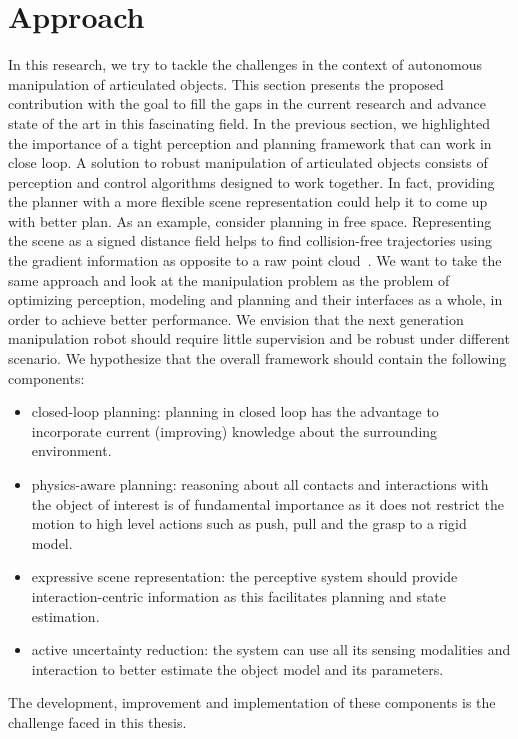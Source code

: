 \section{Approach}
\label{sec:Approach}

In this research, we try to tackle the challenges in the context of autonomous manipulation of articulated objects. This section presents the proposed contribution with the goal to fill the gaps in the current research and advance state of the art in this fascinating field. In the previous section, we highlighted the importance of a tight perception and planning framework that can work in close loop. A solution to robust manipulation of articulated objects consists of perception and control algorithms designed to work together. In fact, providing the planner with a more flexible scene representation could help it to come up with better plan. As an example, consider planning in free space. Representing the scene as a signed distance field helps to find collision-free trajectories using the gradient information as opposite to a raw point cloud~\cite{oleynikova2017voxblox}. We want to take the same approach and look at the manipulation problem as the problem of optimizing perception, modeling and planning and their interfaces as a whole, in order to achieve better performance. We envision that the next generation manipulation robot should require little supervision and be robust under different scenario. We hypothesize that the overall framework should contain the following components:
\begin{itemize}
\item closed-loop planning: planning in closed loop has the advantage to incorporate current (improving) knowledge about the surrounding environment.
\item physics-aware planning: reasoning about all contacts and interactions with the object of interest is of fundamental importance as it does not restrict the motion to high level actions such as push, pull and the grasp to a rigid model.
\item expressive scene representation: the perceptive system should provide interaction-centric information as this facilitates planning and state estimation.
\item active uncertainty reduction: the system can use all its sensing modalities and interaction to better estimate the object model and its parameters. 
\end{itemize}
The development, improvement and implementation of these components is the challenge faced in this thesis. 

